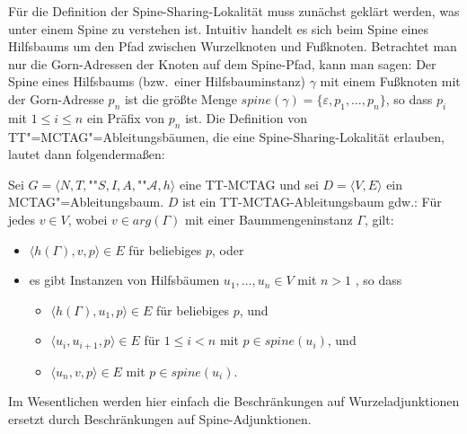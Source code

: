 Für die Definition der Spine-Sharing-Lokalität muss zunächst geklärt werden, was unter einem Spine zu verstehen ist. Intuitiv handelt es sich beim Spine eines Hilfsbaums um den Pfad zwischen Wurzelknoten und Fu\ss knoten. Betrachtet man nur die Gorn-Adressen der Knoten auf dem Spine-Pfad, kann man sagen: Der Spine eines Hilfsbaums (bzw.\ einer Hilfsbauminstanz) $\gamma$ mit einem Fu\ss knoten mit der Gorn-Adresse $p_n$ ist die größte Menge $spine(\gamma) = \{ \varepsilon , p_1 , \ldots, p_n \}$, so dass $p_i$ mit $1 \leq i \leq n$ ein Präfix von $p_n$ ist. Die Definition von TT"=MCTAG"=Ableitungsbäumen, die eine Spine-Sharing-Lokalität erlauben, lautet dann folgenderma\ss en:
\begin{definition}
Sei $G = \langle N,T,$""$S,I,A,$""$\mathcal{A},h \rangle$ eine TT-MCTAG und sei $D = \langle V,E \rangle$ ein MCTAG"=Ableitungsbaum. $D$ ist ein TT-MCTAG-Ablei\-tungs\-baum gdw.:
Für jedes $v \in V$, wobei $v \in arg(\Gamma)$ mit einer Baummengeninstanz $\Gamma$, gilt:
\begin{itemize} 
  \item $\langle h(\Gamma),v,p \rangle \in E$ für beliebiges $p$, oder
  \item es gibt Instanzen von Hilfsbäumen $u_1, \ldots, u_n \in V$ mit $n>1$ , so dass
  \begin{itemize}
    \item $\langle h(\Gamma),u_1,p \rangle \in E$ für beliebiges $p$, und
    \item $\langle u_i,u_{i+1},p \rangle \in E$ für $1 \leq i < n$ mit $p \in spine(u_i)$, und
    \item $\langle u_n,v,p \rangle \in E$ mit $p \in spine(u_i)$.
  \end{itemize}
\end{itemize}  
\end{definition}
Im Wesentlichen werden hier einfach die Beschränkungen auf Wurzeladjunktionen ersetzt durch Beschränkungen auf Spine-Adjunktionen.

